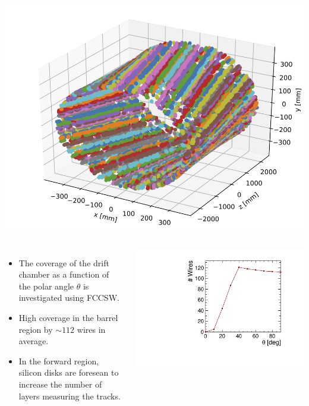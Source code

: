 \documentclass[final,xcolor={dvipsnames,svgnames,x11names,table}]{beamer}
\begin{document}
\begin{frame}
\begin{textblock}{39.5}
\begin{tcolorbox}[title=The simulation of the drift chamber with FCCSW]
\begin{columns}
        \centering
        \includegraphics[width=\textwidth]{Figures/allHits}

    \end{columns}


    \begin{columns}
      \begin{itemize}
        \item The coverage of the drift chamber as a function of the polar angle $\theta$ is investigated using FCCSW.
        \item High coverage in the barrel region by $\sim 112$ wires in average.
        \item In the forward region, silicon disks are foresean to increase the number of layers measuring the tracks.
      \end{itemize}

        \centering
        \includegraphics[width=\textwidth]{Figures/numWires}
    \end{columns}


\end{tcolorbox}
\end{textblock}
\end{frame}
\end{document}
